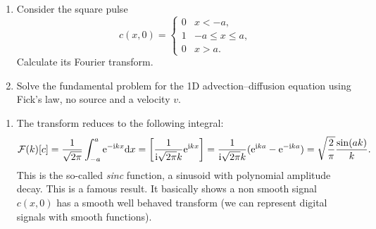 \documentclass[a4paper, 12pt]{article}
\begin{document}
\begin{enumerate}[label={\bf \arabic{*}.\;}, ref={\arabic{*}},itemsep=3ex, left=0ex]
{      \begin{center}
        
        
      \end{center}

    }


    {
      \begin{enumerate}[label=(\roman*)]
        \item Consider the square pulse
          \begin{equation}
            c(x,0) =
            \begin{cases}
              0 & x<-a,\\
              1 & -a\leq x \leq a,\\
              0 & x>a.
            \end{cases}
          \end{equation}
          Calculate its Fourier transform.
        \item Solve the fundamental problem for the 1D advection--diffusion equation using Fick's law, no source and a velocity $v$.

      \end{enumerate}
    }
    {
      \begin{enumerate}[label=(\roman*)]
        \item{The transform reduces to the following integral:
            \begin{equation}
              \mathcal{F}(k)[c]=  \frac{1}{\sqrt{2\pi}}\int_{-a}^{a}\mathrm{e} ^{-\mathrm{i} k x}{\mathrm d}{x} = \left[\frac{1}{\mathrm{i}\sqrt{2\pi}k}\mathrm{e} ^{\mathrm{i} kx}\right] = \frac{1}{\mathrm{i}\sqrt{2\pi}k}(\mathrm{e} ^{\mathrm{i} ka}-\mathrm{e} ^{-\mathrm{i} ka}) = \sqrt{\frac{2}{\pi}}\frac{\sin(ak)}{k}.
            \end{equation}
            This is the so-called \emph{sinc} function, a sinusoid with polynomial amplitude decay. This is a famous result. It basically shows a non smooth signal $c(x,0)$ has a smooth well behaved transform (we can represent digital signals with smooth functions).
          }


\end{enumerate}}
\end{enumerate}
\end{document}
